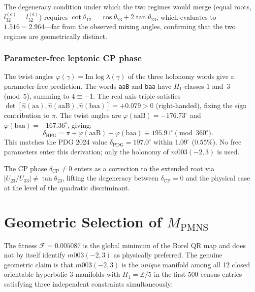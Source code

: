\documentclass[11pt,a4paper]{article}
\begin{document}
\noindent
The degeneracy condition under which the two regimes would merge
(equal roots, $l_{32}^{(\mathrm{c})} = l_{32}^{(\mathrm{e})}$)
requires $\cot\theta_{12} = \cos\theta_{23} + 2\tan\theta_{23}$,
which evaluates to $1.516 = 2.964$---far from the observed mixing
angles, confirming that the two regimes are geometrically distinct.
\subsubsection*{Parameter-free leptonic CP phase}
The twist angles $\varphi(\gamma) = \mathrm{Im}\log\lambda(\gamma)$
of the three holonomy words give a parameter-free prediction.
The words \texttt{aaB} and \texttt{baa} have $H_1$-classes $1$ and~$3$
(mod~5), summing to $4 \equiv -1$. The real axis triple satisfies
$\det[\hat{n}(\mathrm{aa}), \hat{n}(\mathrm{aaB}), \hat{n}(\mathrm{baa})]
= +0.079 > 0$ (right-handed), fixing the sign contribution to $\pi$.
The twist angles are $\varphi(\mathrm{aaB}) = -176.73^\circ$ and
$\varphi(\mathrm{baa}) = -167.36^\circ$, giving:
\begin{equation}
  \boxed{\delta_{\mathrm{HFG}} = \pi + \varphi(\mathrm{aaB}) +
  \varphi(\mathrm{baa}) \equiv 195.91^\circ \pmod{360^\circ}.}
\end{equation}
This matches the PDG 2024 value $\delta_{\mathrm{PDG}} = 197.0^\circ$
within $1.09^\circ$ ($0.55\%$). No free parameters enter this
derivation; only the holonomy of $m003(-2,3)$ is used.

The CP phase $\delta_{\mathrm{CP}} \neq 0$ enters as a correction to
the extended root via $|U_{23}/U_{33}| \neq \tan\theta_{23}$, lifting
the degeneracy between $\delta_{\mathrm{CP}} = 0$ and the physical
case at the level of the quadratic discriminant.

\section{Geometric Selection of $M_{\mathrm{PMNS}}$}
\label{sec:geometric_selection}

The fitness $\mathcal{F} = 0.005087$ is the global minimum of the Borel
QR map and does not by itself identify $m003(-2,3)$ as physically
preferred. The genuine geometric claim is that $m003(-2,3)$ is the
\emph{unique} manifold among all 12 closed orientable hyperbolic
3-manifolds with $H_1 = \mathbb{Z}/5$ in the first 500 census entries
satisfying three independent constraints simultaneously:
\end{document}
